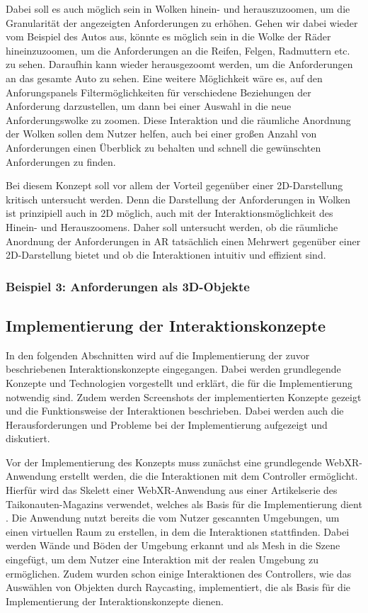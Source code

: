 Dabei soll es auch möglich sein in Wolken hinein- und herauszuzoomen, um die Granularität der angezeigten Anforderungen zu erhöhen.
Gehen wir dabei wieder vom Beispiel des Autos aus, könnte es möglich sein in die Wolke der Räder hineinzuzoomen, um die Anforderungen an die Reifen, Felgen, Radmuttern etc. zu sehen.
Daraufhin kann wieder herausgezoomt werden, um die Anforderungen an das gesamte Auto zu sehen.
Eine weitere Möglichkeit wäre es, auf den Anforungspanels Filtermöglichkeiten für verschiedene Beziehungen der Anforderung darzustellen, um dann bei einer Auswahl in die neue Anforderungswolke zu zoomen.
Diese Interaktion und die räumliche Anordnung der Wolken sollen dem Nutzer helfen, auch bei einer großen Anzahl von Anforderungen einen Überblick zu behalten und schnell die gewünschten Anforderungen zu finden.

Bei diesem Konzept soll vor allem der Vorteil gegenüber einer 2D-Darstellung kritisch untersucht werden.
Denn die Darstellung der Anforderungen in Wolken ist prinzipiell auch in 2D möglich, auch mit der Interaktionsmöglichkeit des Hinein- und Herauszoomens.
Daher soll untersucht werden, ob die räumliche Anordnung der Anforderungen in AR tatsächlich einen Mehrwert gegenüber einer 2D-Darstellung bietet und ob die Interaktionen intuitiv und effizient sind.


\subsubsection{Beispiel 3: Anforderungen als 3D-Objekte}

\subsection{Implementierung der Interaktionskonzepte}

In den folgenden Abschnitten wird auf die Implementierung der zuvor beschriebenen Interaktionskonzepte eingegangen.
Dabei werden grundlegende Konzepte und Technologien vorgestellt und erklärt, die für die Implementierung notwendig sind.
Zudem werden Screenshots der implementierten Konzepte gezeigt und die Funktionsweise der Interaktionen beschrieben.
Dabei werden auch die Herausforderungen und Probleme bei der Implementierung aufgezeigt und diskutiert.

Vor der Implementierung des Konzepts muss zunächst eine grundlegende WebXR-Anwendung erstellt werden, die die Interaktionen mit dem Controller ermöglicht.
Hierfür wird das Skelett einer WebXR-Anwendung aus einer Artikelserie des Taikonauten-Magazins verwendet, welches als Basis für die Implementierung dient \autocite[][]{taikonauten-magazine}.
Die Anwendung nutzt bereits die vom Nutzer gescannten Umgebungen, um einen virtuellen Raum zu erstellen, in dem die Interaktionen stattfinden.
Dabei werden Wände und Böden der Umgebung erkannt und als Mesh in die Szene eingefügt, um dem Nutzer eine Interaktion mit der realen Umgebung zu ermöglichen.
Zudem wurden schon einige Interaktionen des Controllers, wie das Auswählen von Objekten durch Raycasting, implementiert, die als Basis für die Implementierung der Interaktionskonzepte dienen.


